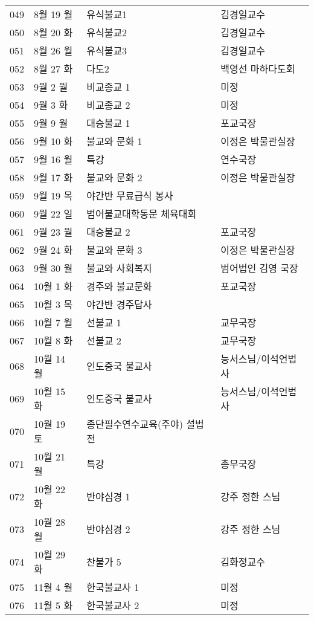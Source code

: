 \documentclass[12pt, a4paper, oneside]{book}
\begin{document}
\begin{center}
\begin{longtable}{| l | l | l |  l |}
		\hline
049	&		8월	19	월	&	유식불교1	&	김경일교수	\\
050	&		8월	20	화	&	유식불교2	&	김경일교수	\\
051	&		8월	26	월	&	유식불교3	&	김경일교수	\\
052	&		8월	27	화	&	다도2	&	백영선 마하다도회	\\
		\hline
		\hline
053	&		9월	2	월	&	비교종교 1	&	미정	\\
054	&		9월	3	화	&	비교종교 2	&	미정	\\
055	&		9월	9	월	&	대승불교 1	&	포교국장	\\
056	&		9월	10	화	&	불교와 문화 1	&	이정은 박물관실장	\\
057	&		9월	16	월	&	특강	&	연수국장	\\
058	&		9월	17	화	&	불교와 문화 2	&	이정은 박물관실장	\\
059	&		9월	19	목	&	야간반 무료급식 봉사	&		\\
		\hline
		\hline
060	&		9월	22	일	&	범어불교대학동문 체육대회	&		\\
		\hline
		\hline
061	&		9월	23	월	&	대승불교 2	&	포교국장	\\
062	&		9월	24	화	&	불교와 문화 3	&	이정은 박물관실장	\\
063	&		9월	30	월	&	불교와 사회복지	&	범어법인 김영 국장	\\
		\hline
064	&		10월	1	화	&	경주와 불교문화	&	포교국장	\\
		\hline
		\hline
065	&		10월	3	목	&	야간반 경주답사	&		\\
		\hline
		\hline
066	&		10월	7	월	&	선불교 1	&	교무국장	\\
067	&		10월	8	화	&	선불교 2	&	교무국장	\\
068	&		10월	14	월	&	인도중국 불교사	&	능서스님/이석언법사	\\
069	&		10월	15	화	&	인도중국 불교사	&	능서스님/이석언법사	\\
		\hline
		\hline
070	&		10월	19	토	&	종단필수연수교육(주야) 설법전	&		\\
		\hline
		\hline
071	&		10월	21	월	&	특강	&	총무국장	\\
072	&		10월	22	화	&	반야심경 1	&	강주 정한 스님	\\
073	&		10월	28	월	&	반야심경 2	&	강주 정한 스님	\\
074	&		10월	29	화	&	찬불가 5	&	김화정교수	\\
		\hline
		\hline
075	&		11월	4	월	&	한국불교사 1	&	미정	\\
076	&		11월	5	화	&	한국불교사 2	&	미정	\\

\end{longtable}
\end{center}
\end{document}
